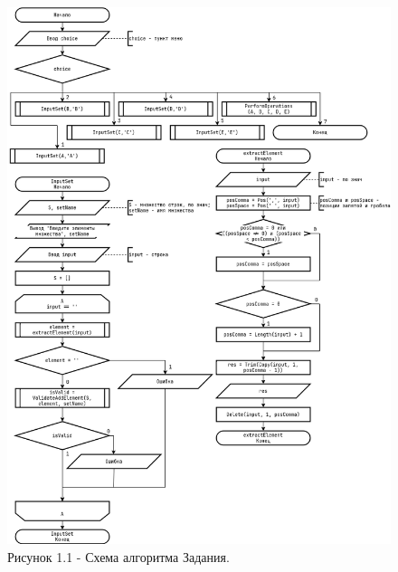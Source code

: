 \documentclass[oneside,a4paper,14pt]{extarticle}
\begin{document}
\clearpage
\begin{figure}[H]
	\centering
	\includegraphics[height=0.9\textheight]{pics/flowchart1.png}
	\caption*{Рисунок 1.1 - Схема алгоритма Задания.}
\end{figure}
\end{document}
